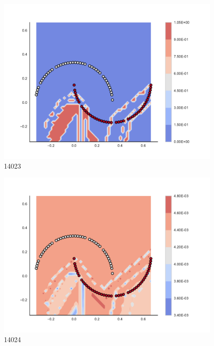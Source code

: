 \begin{subfigure}[b]{0.09\textwidth}
    \includegraphics[clip, trim=2.35cm 1.75cm 4.5cm 0cm,width=\textwidth]{img/convergence/14023.pdf}
    \caption{14023}
    \label{fig:convergence_14023}
\end{subfigure}
%
\begin{subfigure}[b]{0.09\textwidth}
    \includegraphics[clip, trim=2.35cm 1.75cm 4.5cm 0cm,width=\textwidth]{img/convergence/14024.pdf}
    \caption{14024}
    \label{fig:convergence_14024}
\end{subfigure}
%
